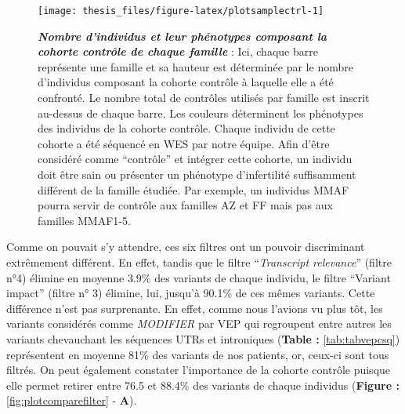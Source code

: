 \documentclass[12pt,twoside]{ugathesis}
\begin{document}
\begin{figure}

{\centering \texttt{[image: thesis\_files/figure-latex/plotsamplectrl-1]} 

}

\caption[Nombre d'individus et leur phénotypes composant la cohorte contrôle de chaque famille]{\textbf{\emph{Nombre d'individus et leur phénotypes
composant la cohorte contrôle de chaque famille}} : Ici, chaque barre
représente une famille et sa hauteur est déterminée par le nombre
d'individus composant la cohorte contrôle à laquelle elle a été
confronté. Le nombre total de contrôles utilisés par famille est inscrit
au-dessus de chaque barre. Les couleurs déterminent les phénotypes des
individus de la cohorte contrôle. Chaque individu de cette cohorte a été
séquencé en WES par notre équipe. Afin d'être considéré comme
``contrôle'' et intégrer cette cohorte, un individu doit être sain ou
présenter un phénotype d'infertilité suffisamment différent de la
famille étudiée. Par exemple, un individus MMAF pourra servir de
contrôle aux familles AZ et FF mais pas aux familles MMAF1-5.}\label{fig:plotsamplectrl}
\end{figure}














\newpage

Comme on pouvait s'y attendre, ces six filtres ont un pouvoir
discriminant extrêmement différent. En effet, tandis que le filtre
``\emph{Transcript relevance}'' (filtre n°4) élimine en moyenne 3.9\%
des variants de chaque individu, le filtre ``Variant impact'' (filtre n°
3) élimine, lui, jusqu'à 90.1\% de ces mêmes variants. Cette différence
n'est pas surprenante. En effet, comme nous l'avions vu plus tôt, les
variants considérés comme \emph{MODIFIER} par VEP qui regroupent entre
autres les variants chevauchant les séquences UTRs et introniques
(\textbf{Table :} \ref{tab:tabvepcsq}) représentent en moyenne 81\% des
variants de nos patients, or, ceux-ci sont tous filtrés. On peut
également constater l'importance de la cohorte contrôle puisque elle
permet retirer entre 76.5 et 88.4\% des variants de chaque individus
(\textbf{Figure :} \ref{fig:plotcomparefilter} - \textbf{A}).
\end{document}

